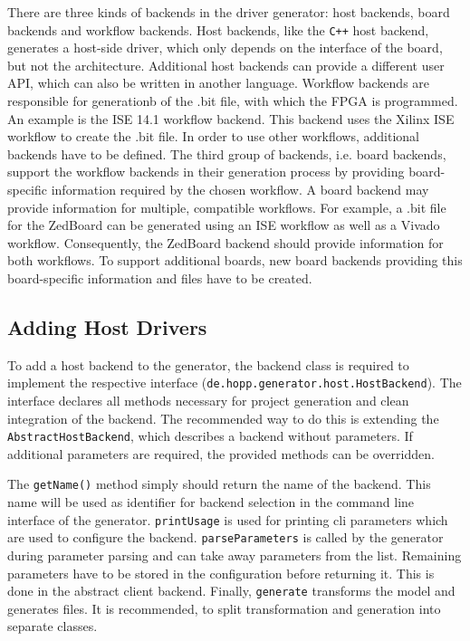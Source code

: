 \documentclass{report}
\begin{document}
There are three kinds of backends in the driver generator: host backends, board backends and workflow backends.
Host backends, like the \texttt{C++} host backend, generates a host-side driver, which only depends on the interface of the board, but not the architecture. Additional host backends can provide a different user API, which can also be written in another language.
Workflow backends are responsible for generationb of the .bit file, with which the FPGA is programmed. An example is the ISE 14.1 workflow backend. This backend uses the Xilinx ISE workflow to create the .bit file. In order to use other workflows, additional backends have to be defined.
The third group of backends, i.e. board backends, support the workflow backends in their generation process by providing board-specific information required by the chosen workflow. A board backend may provide information for multiple, compatible workflows. For example, a .bit file for the ZedBoard can be generated using an ISE workflow as well as a Vivado workflow. Consequently, the ZedBoard backend should provide information for both workflows. To support additional boards, new board backends providing this board-specific information and files have to be created.

\subsection{Adding Host Drivers}
To add a host backend to the generator, the backend class is required to implement the respective interface (\texttt{de.hopp.generator.host.HostBackend}). The interface declares all methods necessary for project generation and clean integration of the backend. The recommended way to do this is extending the \texttt{AbstractHostBackend}, which describes a backend without parameters. If additional parameters are required, the provided methods can be overridden.

The \texttt{getName()} method simply should return the name of the backend. This name will be used as identifier for backend selection in the command line interface of the generator. \texttt{printUsage} is used for printing cli parameters which are used to configure the backend. \texttt{parseParameters} is called by the generator during parameter parsing and can take away parameters from the list. Remaining parameters have to be stored in the configuration before returning it. This is done in the abstract client backend. Finally, \texttt{generate} transforms the model and generates files. It is recommended, to split transformation and generation into separate classes.
\end{document}
